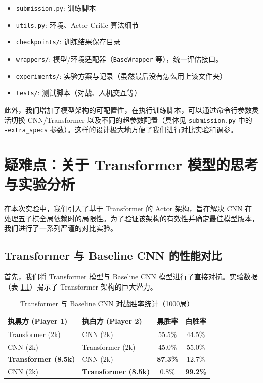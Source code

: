 \documentclass[oneside]{ctexbook}
\begin{document}
\begin{itemize}
    \item \texttt{submission.py}: 训练脚本
    \item \texttt{utils.py}: 环境、Actor-Critic 算法细节
    \item \texttt{checkpoints/}: 训练结果保存目录
    \item \texttt{wrappers/}: 模型/环境适配器（\texttt{BaseWrapper} 等），统一评估接口。
    \item \texttt{experiments/}: 实验方案与记录（虽然最后没有怎么用上该文件夹）
    \item \texttt{tests/}: 测试脚本（对战、人机交互等）
\end{itemize}

此外，我们增加了模型架构的可配置性，在执行训练脚本，可以通过命令行参数灵活切换 CNN/Transformer 以及不同的超参数配置（具体见 \verb|submission.py| 中的 \verb|--extra_specs| 参数）。这样的设计极大地方便了我们进行对比实验和调参。


\chapter{疑难点：关于 Transformer 模型的思考与实验分析} \label{chap:transformer_analysis}

在本次实验中，我们引入了基于 Transformer 的 Actor 架构，旨在解决 CNN 在处理五子棋全局依赖时的局限性。为了验证该架构的有效性并确定最佳模型版本，我们进行了一系列严谨的对比实验。

\section{Transformer 与 Baseline CNN 的性能对比}

首先，我们将 Transformer 模型与 Baseline CNN 模型进行了直接对抗。实验数据（表 \ref{tab:trans_vs_cnn}）揭示了 Transformer 架构的巨大潜力。

\begin{table}[H]
\centering
\caption{Transformer 与 Baseline CNN 对战胜率统计（1000局）}
\label{tab:trans_vs_cnn}
\begin{tabular}{@{}llcc@{}}
\toprule
\textbf{执黑方 (Player 1)} & \textbf{执白方 (Player 2)} & \textbf{黑胜率} & \textbf{白胜率} \\ \midrule
Transformer (2k) & CNN (2k)       & 55.5\% & 44.5\% \\
CNN (2k)         & Transformer (2k) & 45.0\% & 55.0\% \\ \midrule
\textbf{Transformer (8.5k)} & CNN (2k)       & \textbf{87.3\%} & 12.7\% \\
CNN (2k)         & \textbf{Transformer (8.5k)} & 0.8\%  & \textbf{99.2\%} \\ \bottomrule
\end{tabular}
\end{table}
\end{document}
